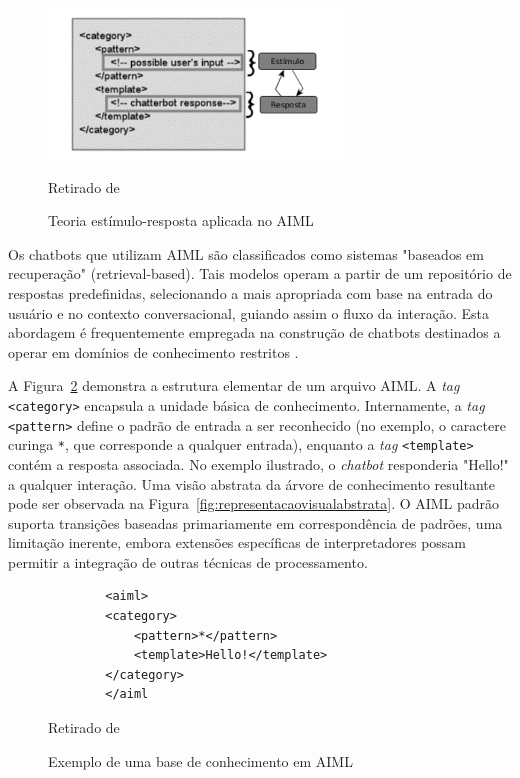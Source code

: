 \documentclass[14pt,a4paper,oneside]{book}
\begin{document}
\begin{figure}
    \centering
    \caption{Teoria estímulo-resposta aplicada no AIML}
    \includegraphics[width=0.7\textwidth]{./fig/image10.png} %
    \label{fig:teoriaestimulo}
    \vspace{0.2cm}
    {\footnotesize 
	
	Retirado de \cite{Lima2017}}
\end{figure}

Os chatbots que utilizam AIML são classificados como sistemas "baseados em recuperação" (retrieval-based). Tais modelos operam a partir de um repositório de respostas predefinidas, selecionando a mais apropriada com base na entrada do usuário e no contexto conversacional, guiando assim o fluxo da interação. Esta abordagem é frequentemente empregada na construção de chatbots destinados a operar em domínios de conhecimento restritos \cite{Borah2019}.

A Figura~\ref{fig:exemplodeumabase} demonstra a estrutura elementar de um arquivo AIML. A \emph{tag} \texttt{<category>} encapsula a unidade básica de conhecimento. Internamente, a \emph{tag} \texttt{<pattern>} define o padrão de entrada a ser reconhecido (no exemplo, o caractere curinga \texttt{*}, que corresponde a qualquer entrada), enquanto a \emph{tag} \texttt{<template>} contém a resposta associada. No exemplo ilustrado, o \emph{chatbot} responderia "Hello!" a qualquer interação. Uma visão abstrata da árvore de conhecimento resultante pode ser observada na Figura~\ref{fig:representacaovisualabstrata}. O AIML padrão suporta transições baseadas primariamente em correspondência de padrões, uma limitação inerente, embora extensões específicas de interpretadores possam permitir a integração de outras técnicas de processamento.

\begin{figure}
	\centering
	\caption{Exemplo de uma base de conhecimento em AIML}
	\begin{verbatim}
		<aiml>
		<category>
			<pattern>*</pattern>
			<template>Hello!</template>
		</category>
		</aiml
	\end{verbatim}	
	\label{fig:exemplodeumabase}
	\vspace{0.2cm} %
    {\footnotesize 
	
	Retirado de \cite{Wallace2000}}
\end{figure}
\end{document}
